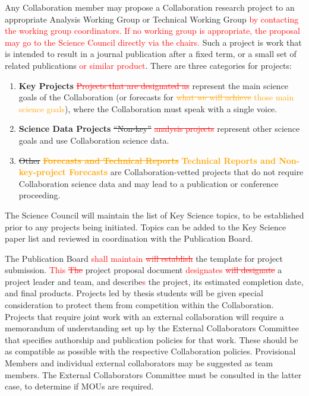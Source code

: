 \documentclass[12pt]{article}
\newcommand{\revision}[1]{\textcolor{Red}{#1}}
\newcommand{\revtwo}[1]{\textcolor{Emerald}{#1}}
\newcommand{\revthree}[1]{\textcolor{Orange}{#1}}
\begin{document}
Any Collaboration member may propose a Collaboration research project to an appropriate Analysis Working Group or Technical Working Group \revision{by contacting the working group coordinators.  If no working group is appropriate, the proposal may go to the Science Council directly via the chairs.}  Such a project is work that is intended to result in a journal publication after a fixed term, or a small set of related publications \revision{or similar product}.  There are three categories for projects:
\begin{enumerate}
\item \revtwo{\textbf{Key Projects}} \revision{\sout{Projects that are designated as}}  represent the main science goals of the Collaboration (or forecasts for \revthree{\sout{what we will achieve} those main science goals}), where the Collaboration must speak with a single voice.  
\item \revtwo{\textbf{Science Data Projects} \sout{``Non-key''}}  \revision{\sout{analysis projects}}  represent other science goals and use Collaboration science data.  
\item \revtwo{\sout{Other}} \revthree{\sout{\textbf{Forecasts and Technical Reports}} \textbf{Technical Reports and Non-key-project Forecasts}} are Collaboration-vetted projects that do not require Collaboration science data and may lead to a publication or conference proceeding.  
\end{enumerate}
The Science Council will maintain the list of Key Science topics, to be established prior to any projects being initiated.  Topics can be added to the Key Science paper list and reviewed in coordination with the Publication Board.

The Publication Board \revision{shall maintain \sout{will establish}} the template for project submission. \revision{This \sout{The}} project proposal document \revision{designates \sout{will designate}} a project leader and team, and describe\revision{s} the project, its estimated completion date, and final products.  
Projects led by thesis students will be given special consideration to protect them from competition within the Collaboration.  Projects that require joint work with an external collaboration will require a memorandum of understanding set up by the External Collaborators Committee that specifies authorship and publication policies for that work.  These should be as compatible as possible with the respective Collaboration policies.  Provisional Members and individual external collaborators may be suggested as team members.  The External Collaborators Committee must be consulted in the latter case, to determine if MOUs are required.  
\end{document}
